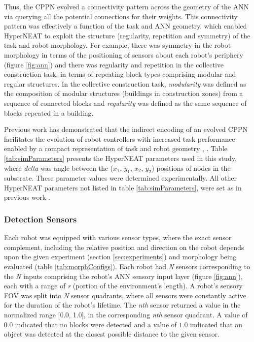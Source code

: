 \documentclass[conference]{IEEEtran}
\begin{document}
Thus, the CPPN evolved a connectivity pattern across the geometry of the ANN via querying all the potential
connections for their weights.
This connectivity pattern was effectively a function of the task and ANN geometry,
which enabled HyperNEAT to exploit the structure (regularity, repetition and symmetry) of the task and robot morphology.
For example, there was symmetry in the robot morphology in terms of the positioning of sensors about each
robot's periphery (figure \ref{fig:ann}) and there was regularity and repetition in the collective construction
task, in terms of repeating block types comprising modular and regular structures.
In the collective construction task, \textit{modularity} was defined as the composition of modular structures
(buildings in construction zones) from a sequence of connected blocks and \textit{regularity} was defined
as the same sequence of blocks repeated in a building.

Previous work has demonstrated that the indirect encoding of an evolved CPPN facilitates the evolution of
robot controllers with increased task performance enabled by a compact representation
of task and robot geometry \cite{DAmbrosioStanley2008}, \cite{WatsonNitschke2015SSCI}.
Table \ref{tab:simParameters} presents the HyperNEAT parameters used in this study, where \textit{delta}
was angle between the ($x_{1}$, $y_{1}$, $x_{2}$, $y_{2}$) positions of nodes in the substrate.
These parameter values were determined experimentally.   All other HyperNEAT parameters not listed in
table \ref{tab:simParameters}, were set as in previous work \cite{DAmbrosioStanley2008}.

\subsubsection{Detection Sensors}
Each robot was equipped with various sensor types, where the exact sensor complement, including the
relative position and direction on the robot depends upon the given experiment
(section \ref{sec:experiments}) and morphology being evaluated (table \ref{tab:morphConfigs}).
Each robot had \textit{N} sensors corresponding to the \textit{N} inputs comprising the robot's
ANN sensory input layer (figure \ref{fig:ann}), each with a range of \textit{r}
(portion of the environment's length).
A robot's sensory FOV was split into \textit{N} sensor quadrants, where all sensors were constantly active
for the duration of the robot's lifetime.
The \textit{nth} sensor returned a value in the normalized range [0.0, 1.0],
in the corresponding \textit{nth} sensor quadrant.
A value of $0.0$ indicated that no blocks were detected and a value of $1.0$ indicated that an object was detected
at the closest possible distance to the given sensor.
\end{document}
